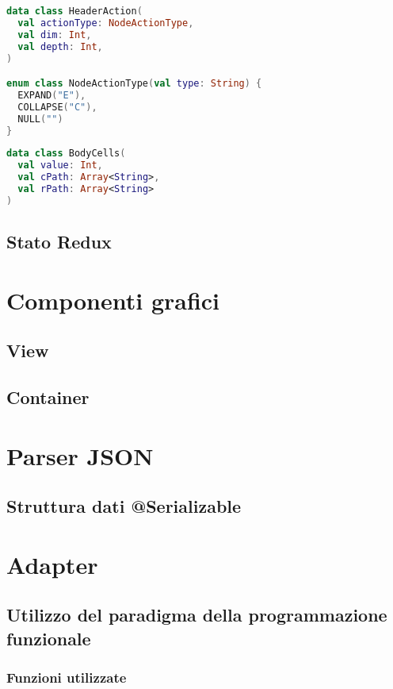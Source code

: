 \begin{lstlisting}[caption={BodyCells}, label={lst:example1}, language=Kotlin]
data class HeaderAction(
  val actionType: NodeActionType,
  val dim: Int,
  val depth: Int,
)

enum class NodeActionType(val type: String) {
  EXPAND("E"),
  COLLAPSE("C"),
  NULL("")
}
\end{lstlisting}

\begin{lstlisting}[caption={BodyCells}, label={lst:example1}, language=Kotlin]
data class BodyCells(
  val value: Int,
  val cPath: Array<String>,
  val rPath: Array<String>
)
\end{lstlisting}

\subsection{Stato Redux}

\section{Componenti grafici}
\subsection{View}
\subsection{Container}

\section{Parser JSON}
\subsection{Struttura dati @Serializable}

\section{Adapter}
\subsection{Utilizzo del paradigma della programmazione funzionale}
\subsubsection{Funzioni utilizzate}

